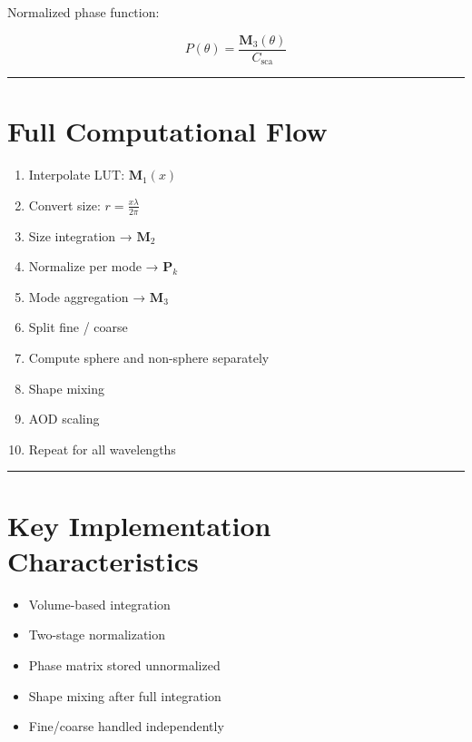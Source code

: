 \documentclass[
  letterpaper,
]{scrbook}
\providecommand{\tightlist}{%
  \setlength{\itemsep}{0pt}\setlength{\parskip}{0pt}}
\begin{document}
Normalized phase function:

\[
P(\theta) = \frac{\mathbf{M}_3(\theta)}{C_{\text{sca}}}
\]

\begin{center}\rule{0.5\linewidth}{0.5pt}\end{center}

\section{Full Computational Flow}\label{full-computational-flow}

\begin{enumerate}
\def\labelenumi{\arabic{enumi}.}
\tightlist
\item
  Interpolate LUT: \(\mathbf{M}_1(x)\)\\
\item
  Convert size: \(r = \frac{x\lambda}{2\pi}\)\\
\item
  Size integration → \(\mathbf{M}_2\)\\
\item
  Normalize per mode → \(\mathbf{P}_k\)\\
\item
  Mode aggregation → \(\mathbf{M}_3\)\\
\item
  Split fine / coarse\\
\item
  Compute sphere and non-sphere separately\\
\item
  Shape mixing\\
\item
  AOD scaling\\
\item
  Repeat for all wavelengths
\end{enumerate}

\begin{center}\rule{0.5\linewidth}{0.5pt}\end{center}

\section{Key Implementation
Characteristics}\label{key-implementation-characteristics}

\begin{itemize}
\tightlist
\item
  Volume-based integration\\
\item
  Two-stage normalization\\
\item
  Phase matrix stored unnormalized\\
\item
  Shape mixing after full integration\\
\item
  Fine/coarse handled independently
\end{itemize}
\end{document}

